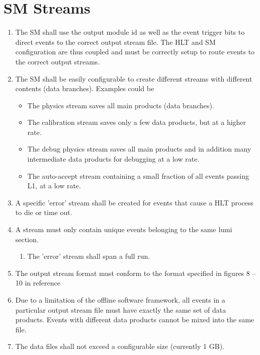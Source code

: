 \documentclass[]{article}
\begin{document}
\section{SM Streams}

\begin{enumerate}

\item The SM shall use the output module id as well as the event trigger bits to direct events to the correct output stream file. The HLT and SM configuration are thus coupled and must be correctly setup to route events to the correct output streams. 

\item The SM shall be easily configurable to create different streams with different contents (data branches). Examples could be
\begin{itemize}
\item The physics stream saves all main products (data branches).
\item The calibration stream saves only a few data products, but at a higher rate.
\item The debug physics stream saves all main products and in addition many intermediate data 
products for debugging at a low rate.
\item The auto-accept stream containing a small fraction of all events passing L1, at a low rate.
\end{itemize}

\item A specific 'error' stream shall be created for events that cause a HLT process to die or time out.

\item A stream must only contain unique events belonging to the same lumi section.
\begin{enumerate}
\item The 'error' stream shall span a full run.
\end{enumerate}

\item The output stream format must conform to the format specified in figures 8 -- 10 in reference~\cite{smreviewdoc2}

\item Due to a limitation of the offline software framework, all events in a particular output stream 
file must have exactly the same set of data products. Events with different data products cannot 
be mixed into the same file. 

\item The data files shall not exceed a configurable size (currently 1 GB).


\end{enumerate}
\end{document}
